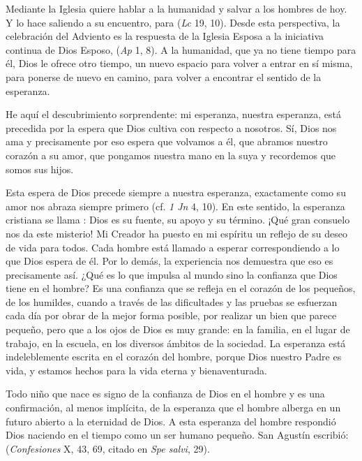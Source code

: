 Mediante la Iglesia quiere hablar a la humanidad y salvar a los hombres de hoy. Y lo hace saliendo a su encuentro, para  (\emph{Lc} 19, 10). Desde esta perspectiva, la celebración del Adviento es la respuesta de la Iglesia Esposa a la iniciativa continua de Dios Esposo,  (\emph{Ap} 1, 8). A la humanidad, que ya no tiene tiempo para él, Dios le ofrece otro tiempo, un nuevo espacio para volver a entrar en sí misma, para ponerse de nuevo en camino, para volver a encontrar el sentido de la esperanza.

He aquí el descubrimiento sorprendente: mi esperanza, nuestra esperanza, está precedida por la espera que Dios cultiva con respecto a nosotros. Sí, Dios nos ama y precisamente por eso espera que volvamos a él, que abramos nuestro corazón a su amor, que pongamos nuestra mano en la suya y recordemos que somos sus hijos.

Esta espera de Dios precede siempre a nuestra esperanza, exactamente como su amor nos abraza siempre primero (cf. \emph{1 Jn} 4, 10). En este sentido, la esperanza cristiana se llama : Dios es su fuente, su apoyo y su término. ¡Qué gran consuelo nos da este misterio! Mi Creador ha puesto en mi espíritu un reflejo de su deseo de vida para todos. Cada hombre está llamado a esperar correspondiendo a lo que Dios espera de él. Por lo demás, la experiencia nos demuestra que eso es precisamente así. ¿Qué es lo que impulsa al mundo sino la confianza que Dios tiene en el hombre? Es una confianza que se refleja en el corazón de los pequeños, de los humildes, cuando a través de las dificultades y las pruebas se esfuerzan cada día por obrar de la mejor forma posible, por realizar un bien que parece pequeño, pero que a los ojos de Dios es muy grande: en la familia, en el lugar de trabajo, en la escuela, en los diversos ámbitos de la sociedad. La esperanza está indeleblemente escrita en el corazón del hombre, porque Dios nuestro Padre es vida, y estamos hechos para la vida eterna y bienaventurada.

Todo niño que nace es signo de la confianza de Dios en el hombre y es una confirmación, al menos implícita, de la esperanza que el hombre alberga en un futuro abierto a la eternidad de Dios. A esta esperanza del hombre respondió Dios naciendo en el tiempo como un ser humano pequeño. San Agustín escribió:  (\emph{Confesiones} X, 43, 69, citado en \emph{Spe salvi}, 29).

